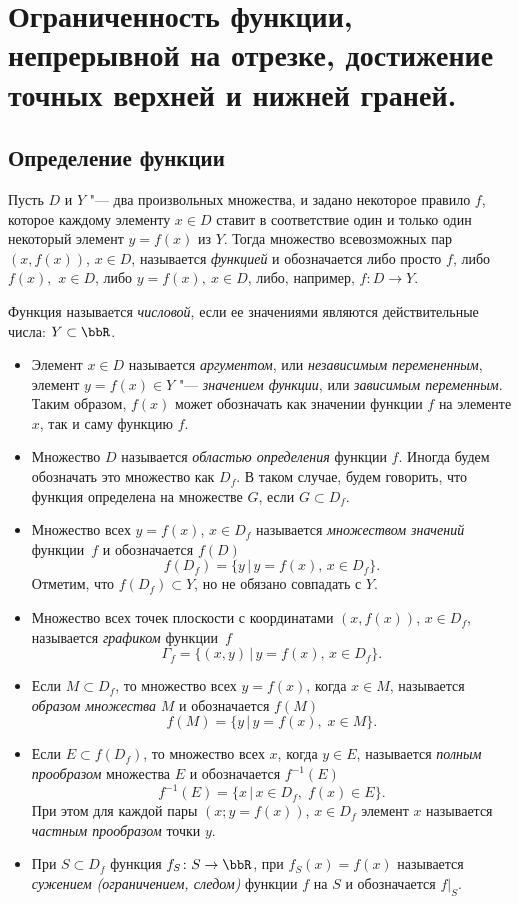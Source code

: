 \chapter{Ограниченность функции, непрерывной на отрезке, достижение точных верхней и нижней граней.}\label{chapter2}

\section{Определение функции}
\begin{defn}
Пусть $D$ и $Y$ "--- два произвольных множества, и задано некоторое правило $f$, которое каждому элементу $x\in D$ ставит в соответствие один и только один некоторый элемент $y=f(x)$ из $Y$. Тогда множество всевозможных пар $(x, f(x))$, $x\in D$, называется \textit{функцией} и обозначается либо просто $f$, либо $f(x),$ $x\in D$, либо $y=f(x),\ x\in D$, либо, например, $f\colon D \to Y$.
\end{defn}

Функция называется \textit{числовой}, если ее значениями являются действительные числа: $Y \subset \bbR$.
\begin{itemize}[wide, labelwidth=!, labelindent=0pt]
\item
Элемент $x \in D$ называется \textit{аргументом}, или \textit{независимым перемененным}, элемент $y=f(x) \in Y$ "--- \textit{значением функции}, или \textit{зависимым переменным}. Таким образом, $f(x)$ может обозначать как значении функции $f$ на элементе $x$, так и саму функцию $f$.
\item
Множество $D$ называется \textit{областью определения} функции $f$. Иногда будем обозначать это множество как $D_f$. В таком случае, будем говорить, что функция определена на множестве $G$, если $G \subset D_f$. 
\item
Множество всех $y=f(x)$, $x\in D_f$ называется \textit{множеством значений} функции~$f$ и обозначается $f(D)$ 
$$
f(D_f)=\{y \,\big|\, y=f(x),\, x\in D_f\}.
$$
Отметим, что $f(D_f) \subset Y$, но не обязано совпадать с $Y$.
\item 
Множество всех точек плоскости с координатами $(x, f(x))$, $x\in D_f$, называется \textit{графиком} функции~$f$ 
$$
\Gamma_f = \{(x,y) \,\big|\, y = f(x),\, x\in D_f\}.
$$
\item
Если $M \subset D_f$, то множество всех $y=f(x)$, когда $x\in M$, называется \textit{образом множества} $M$ и обозначается $f(M)$ $$f(M) = \{y\,\big|\, y=f(x),\; x\in M\}.$$
\item
Если $E \subset f(D_f)$, то множество всех $x$, когда $y\in E$, называется \textit{полным прообразом} множества $E$ и обозначается $f^{-1}(E)$ 
$$
f^{-1}(E)=\{x \,\big|\, x\in D_f,\; f(x)\in E\}.
$$
При этом для каждой пары $(x; y=f(x))$, $x\in D_f$ элемент $x$ называется \textit{частным прообразом} точки $y$.
\item
При $S\subset D_f$ функция $f_S\colon S\to\bbR$, при $f_S(x)=f(x)$ называется \textit{сужением (ограничением, следом)} функции $f$ на $S$ и обозначается $f\bigr|_S$.
\end{itemize}
 
